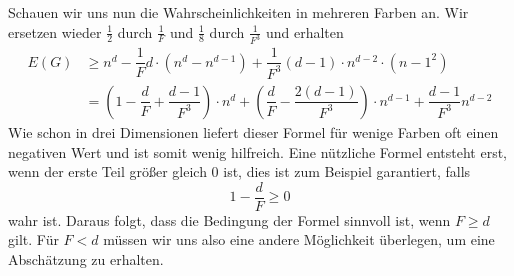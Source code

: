 \documentclass[11pt,a4paper]{article}
\numberwithin{equation}{section}
\numberwithin{table}{section}
\numberwithin{figure}{section}
\begin{document}
Schauen wir uns nun die Wahrscheinlichkeiten in mehreren Farben an.
Wir ersetzen wieder $\frac{1}{2}$ durch $\frac{1}{F}$ und $\frac{1}{8}$ durch $\frac{1}{F^{3}}$ und erhalten
\begin{align*}
    E(G)&\geq n^{d}-\dfrac{1}{F}d\cdot(n^{d}-n^{d-1})+\dfrac{1}{F^3}(d-1)\cdot n^{d-2}\cdot(n-1^{2})\\
    &=\left(1-\dfrac{d}{F}+\dfrac{d-1}{F^3}\right)\cdot n^d+\left(\dfrac{d}{F}-\dfrac{2(d-1)}{F^3}\right)\cdot n^{d-1}+\dfrac{d-1}{F^3}n^{d-2}
\end{align*}
\noindent Wie schon in drei Dimensionen liefert dieser Formel für wenige Farben oft einen negativen Wert und ist somit wenig hilfreich. Eine nützliche Formel entsteht erst, wenn der erste Teil größer gleich 0 ist, dies ist zum Beispiel garantiert, falls
$$ 1-\dfrac{d}{F}\geq 0$$ wahr ist. Daraus folgt, dass die Bedingung der Formel sinnvoll ist, wenn $F\geq d$ gilt.
Für $F<d$ müssen wir uns also eine andere Möglichkeit überlegen, um eine Abschätzung zu erhalten.
\end{document}
